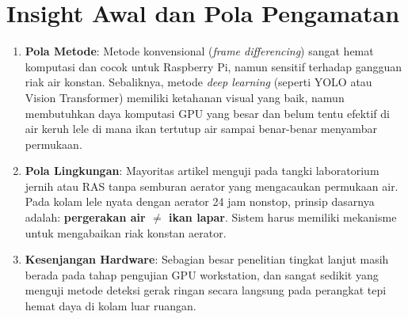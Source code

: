 \documentclass[11pt,a4paper]{article}
\begin{document}
\section{Insight Awal dan Pola Pengamatan}
\begin{enumerate}
    \item \textbf{Pola Metode}: Metode konvensional (\textit{frame differencing}) sangat hemat komputasi dan cocok untuk Raspberry Pi, namun sensitif terhadap gangguan riak air konstan. Sebaliknya, metode \textit{deep learning} (seperti YOLO atau Vision Transformer) memiliki ketahanan visual yang baik, namun membutuhkan daya komputasi GPU yang besar dan belum tentu efektif di air keruh lele di mana ikan tertutup air sampai benar-benar menyambar permukaan.
    \item \textbf{Pola Lingkungan}: Mayoritas artikel menguji pada tangki laboratorium jernih atau RAS tanpa semburan aerator yang mengacaukan permukaan air. Pada kolam lele nyata dengan aerator 24 jam nonstop, prinsip dasarnya adalah: \textbf{pergerakan air $\neq$ ikan lapar}. Sistem harus memiliki mekanisme untuk mengabaikan riak konstan aerator.
    \item \textbf{Kesenjangan Hardware}: Sebagian besar penelitian tingkat lanjut masih berada pada tahap pengujian GPU workstation, dan sangat sedikit yang menguji metode deteksi gerak ringan secara langsung pada perangkat tepi hemat daya di kolam luar ruangan.
\end{enumerate}
\end{document}
